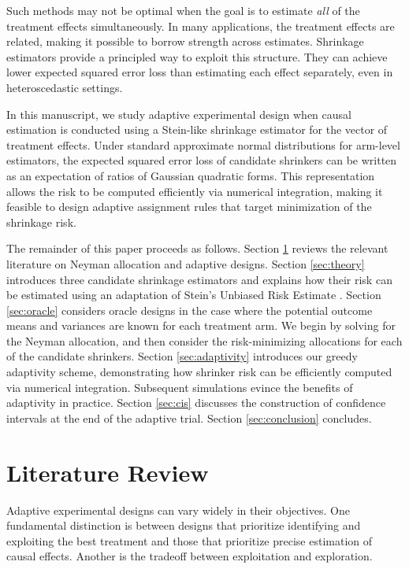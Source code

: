 \documentclass{article}
\begin{document}
Such methods may not be optimal when the goal is to estimate \emph{all} of the treatment effects simultaneously. In many applications, the treatment effects are related, making it possible to borrow strength across estimates. Shrinkage estimators provide a principled way to exploit this structure. They can achieve lower expected squared error loss than estimating each effect separately, even in heteroscedastic settings.

In this manuscript, we study adaptive experimental design when causal estimation is conducted using a Stein-like shrinkage estimator for the vector of treatment effects. Under standard approximate normal distributions for arm-level estimators, the expected squared error loss of 
candidate shrinkers can be written as an expectation of ratios of Gaussian quadratic forms. This representation allows the risk to be computed efficiently via numerical integration, making it feasible to design adaptive assignment rules that target minimization of the shrinkage risk. 

The remainder of this paper proceeds as follows. Section \ref{sec:litreview} reviews the relevant literature on Neyman allocation and adaptive designs. Section \ref{sec:theory} introduces three candidate shrinkage estimators and explains how their risk can be estimated using an adaptation of Stein's Unbiased Risk Estimate \citep{stein1981estimation}. Section \ref{sec:oracle} considers oracle designs in the case where the potential outcome means and variances are known for each treatment arm. We begin by solving for the Neyman allocation, and then consider the risk-minimizing allocations for each of the candidate shrinkers. Section \ref{sec:adaptivity} introduces our greedy adaptivity scheme, demonstrating how shrinker risk can be efficiently computed via numerical integration. Subsequent simulations evince the benefits of adaptivity in practice. Section \ref{sec:cis} discusses the construction of confidence intervals at the end of the adaptive trial. Section \ref{sec:conclusion} concludes. 


\section{Literature Review}\label{sec:litreview}

Adaptive experimental designs can vary widely in their objectives. One fundamental distinction is between designs that prioritize identifying and exploiting the best treatment and those that prioritize precise estimation of causal effects. Another is the tradeoff between exploitation and exploration. 
\end{document}

